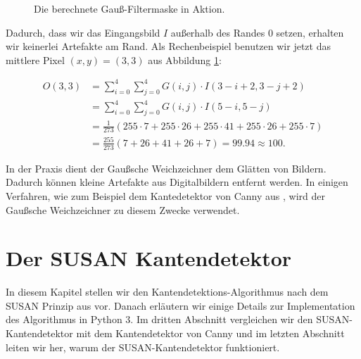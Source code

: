 \documentclass[a4paper, 11pt]{report}
\theoremstyle{definition}
\begin{document}
\begin{center}
\begin{figure}[H]
\begin{minipage}{.475\textwidth}
				\end{minipage}
			\normalsize
			\caption{Die berechnete Gauß-Filtermaske in Aktion.}
			\label{fig:gaussian-example}
			\end{figure}
		\end{center}

		Dadurch, dass wir das Eingangsbild $I$ außerhalb des Randes 0 setzen, erhalten wir keinerlei Artefakte am Rand. Als Rechenbeispiel benutzen wir jetzt das mittlere Pixel $(x,y) = (3,3)$ aus Abbildung \ref{fig:gaussian-example}:

		\begin{align*}
			O(3,3) 	&= \sum_{i=0}^{4} \sum_{j=0}^{4} G(i,j) \cdot I(3-i+2, 3-j+2) 											\\
					&= \sum_{i=0}^{4} \sum_{j=0}^{4} G(i,j) \cdot I(5-i, 5-j) 												\\
					&= \frac{1}{273} \left( 255 \cdot 7 + 255 \cdot 26 + 255 \cdot 41 + 255 \cdot 26 + 255 \cdot 7 \right) 	\\
					&= \frac{255}{273} \left(7 + 26 + 41 + 26 + 7 \right) = 99.94 \approx 100.
		\end{align*}

		In der Praxis dient der Gaußsche Weichzeichner dem Glätten von Bildern. Dadurch können kleine Artefakte aus Digitalbildern entfernt werden. In einigen Verfahren, wie zum Beispiel dem Kantedetektor von Canny aus \cite{canny}, wird der Gaußsche Weichzeichner zu diesem Zwecke verwendet.

\chapter{Der SUSAN Kantendetektor}
	In diesem Kapitel stellen wir den Kantendetektions-Algorithmus nach dem SUSAN Prinzip aus \cite{SUSAN} vor. Danach erläutern wir einige Details zur Implementation des Algorithmus in Python 3. Im dritten Abschnitt vergleichen wir den SUSAN-Kantendetektor mit dem Kantendetektor von Canny und im letzten Abschnitt leiten wir her, warum der SUSAN-Kantendetektor funktioniert.
\end{document}
